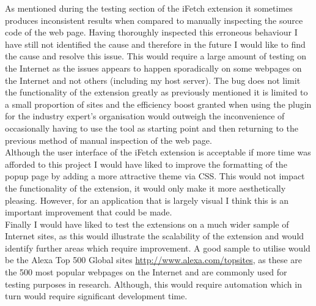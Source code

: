 \documentclass[12pt]{article}
\begin{document}
As mentioned during the testing section of the iFetch extension it sometimes produces inconsistent results when compared to manually inspecting the source code of the web page. Having thoroughly inspected this erroneous behaviour I have still not identified the cause and therefore in the future I would like to find the cause and resolve this issue. This would require a large amount of testing on the Internet as the issues appears to happen sporadically on some webpages on the Internet and not others (including my host server). The bug does not limit the functionality of the extension greatly as previously mentioned it is limited to a small proportion of sites and the efficiency boost granted when using the plugin for the industry expert's organisation would outweigh the inconvenience of occasionally having to use the tool as starting point and then returning to the previous method of manual inspection of the web page. \\  

Although the user interface of the iFetch extension is acceptable if more time was afforded to this project I would have liked to improve the formatting of the popup page by adding a more attractive theme via CSS. This would not impact the functionality of the extension, it would only make it more aesthetically pleasing. However, for an application that is largely visual I think this is an important improvement that could be made. \\

Finally I would have liked to test the extensions on a much wider sample of Internet sites, as this would illustrate the scalability of the extension and would identify further areas which require improvement. A good sample to utilise would be the Alexa Top 500 Global sites \url{http://www.alexa.com/topsites}, as these are the 500 most popular webpages on the Internet and are commonly used for testing purposes in research. Although, this would require automation which in turn would require significant development time.   

\pagebreak
\end{document}
